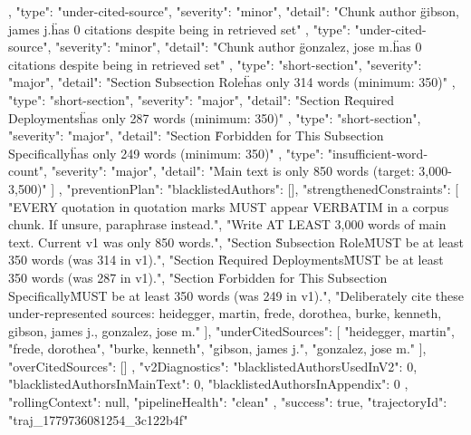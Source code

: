 {{{{{          },
          {
            "type": "under-cited-source",
            "severity": "minor",
            "detail": "Chunk author \"gibson, james j.\" has 0 citations despite being in retrieved set"
          },
          {
            "type": "under-cited-source",
            "severity": "minor",
            "detail": "Chunk author \"gonzalez, jose m.\" has 0 citations despite being in retrieved set"
          },
          {
            "type": "short-section",
            "severity": "major",
            "detail": "Section \"Subsection Role\" has only 314 words (minimum: 350)"
          },
          {
            "type": "short-section",
            "severity": "major",
            "detail": "Section \"Required Deployments\" has only 287 words (minimum: 350)"
          },
          {
            "type": "short-section",
            "severity": "major",
            "detail": "Section \"Forbidden for This Subsection Specifically\" has only 249 words (minimum: 350)"
          },
          {
            "type": "insufficient-word-count",
            "severity": "major",
            "detail": "Main text is only 850 words (target: 3,000-3,500)"
          }
        ]
      },
      "preventionPlan": {
        "blacklistedAuthors": [],
        "strengthenedConstraints": [
          "EVERY quotation in quotation marks MUST appear VERBATIM in a corpus chunk. If unsure, paraphrase instead.",
          "Write AT LEAST 3,000 words of main text. Current v1 was only 850 words.",
          "Section \"Subsection Role\" MUST be at least 350 words (was 314 in v1).",
          "Section \"Required Deployments\" MUST be at least 350 words (was 287 in v1).",
          "Section \"Forbidden for This Subsection Specifically\" MUST be at least 350 words (was 249 in v1).",
          "Deliberately cite these under-represented sources: heidegger, martin, frede, dorothea, burke, kenneth, gibson, james j., gonzalez, jose m."
        ],
        "underCitedSources": [
          "heidegger, martin",
          "frede, dorothea",
          "burke, kenneth",
          "gibson, james j.",
          "gonzalez, jose m."
        ],
        "overCitedSources": []
      },
      "v2Diagnostics": {
        "blacklistedAuthorsUsedInV2": 0,
        "blacklistedAuthorsInMainText": 0,
        "blacklistedAuthorsInAppendix": 0
      }
    },
    "rollingContext": null,
    "pipelineHealth": "clean"
  },
  "success": true,
  "trajectoryId": "traj_1779736081254_3c122b4f"
}
